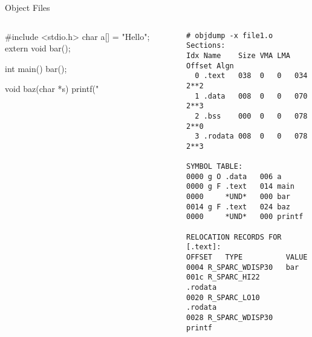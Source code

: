 \documentclass{plt}
\begin{document}
\begin{frame}[fragile]{Object Files}

\begin{columns}
  \begin{column}{0.3\textwidth}

\begin{C}
#include <stdio.h>
char a[] = "Hello";
extern void bar();

int main() {
  bar();
}

void baz(char *s) {
  printf("%
}
\end{C}
  \end{column}
  \begin{column}{0.7\textwidth}
\fontsize{10}{10}\selectfont
\begin{verbatim}
# objdump -x file1.o
Sections:
Idx Name    Size VMA LMA Offset Algn
  0 .text   038  0   0   034    2**2
  1 .data   008  0   0   070    2**3
  2 .bss    000  0   0   078    2**0
  3 .rodata 008  0   0   078    2**3

SYMBOL TABLE:
0000 g O .data   006 a
0000 g F .text   014 main
0000     *UND*   000 bar
0014 g F .text   024 baz
0000     *UND*   000 printf

RELOCATION RECORDS FOR [.text]:
OFFSET   TYPE          VALUE 
0004 R_SPARC_WDISP30   bar
001c R_SPARC_HI22      .rodata
0020 R_SPARC_LO10      .rodata
0028 R_SPARC_WDISP30   printf
\end{verbatim}
  \end{column}
\end{columns}

\end{frame}
\end{document}
